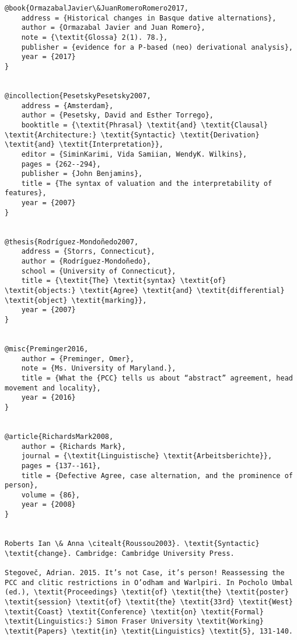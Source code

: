 \documentclass[output=paper,modfonts,nonflat]{langsci/langscibook}
\begin{document}
\begin{verbatim}
@book{OrmazabalJavier\&JuanRomeroRomero2017,
	address = {Historical changes in Basque dative alternations},
	author = {Ormazabal Javier and Juan Romero},
	note = {\textit{Glossa} 2(1). 78.},
	publisher = {evidence for a P-based (neo) derivational analysis},
	year = {2017}
}


@incollection{PesetskyPesetsky2007,
	address = {Amsterdam},
	author = {Pesetsky, David and Esther Torrego},
	booktitle = {\textit{Phrasal} \textit{and} \textit{Clausal} \textit{Architecture:} \textit{Syntactic} \textit{Derivation} \textit{and} \textit{Interpretation}},
	editor = {SiminKarimi, Vida Samiian, WendyK. Wilkins},
	pages = {262--294},
	publisher = {John Benjamins},
	title = {The syntax of valuation and the interpretability of features},
	year = {2007}
}


@thesis{Rodríguez-Mondoñedo2007,
	address = {Storrs, Connecticut},
	author = {Rodríguez-Mondoñedo},
	school = {University of Connecticut},
	title = {\textit{The} \textit{syntax} \textit{of} \textit{objects:} \textit{Agree} \textit{and} \textit{differential} \textit{object} \textit{marking}},
	year = {2007}
}


@misc{Preminger2016,
	author = {Preminger, Omer},
	note = {Ms. University of Maryland.},
	title = {What the {PCC} tells us about “abstract” agreement, head movement and locality},
	year = {2016}
}


@article{RichardsMark2008,
	author = {Richards Mark},
	journal = {\textit{Linguistische} \textit{Arbeitsberichte}},
	pages = {137--161},
	title = {Defective Agree, case alternation, and the prominence of person},
	volume = {86},
	year = {2008}
}


Roberts Ian \& Anna \citealt{Roussou2003}. \textit{Syntactic} \textit{change}. Cambridge: Cambridge University Press.

Stegoveč, Adrian. 2015. It’s not Case, it’s person! Reassessing the PCC and clitic restrictions in O’odham and Warlpiri. In Pocholo Umbal (ed.), \textit{Proceedings} \textit{of} \textit{the} \textit{poster} \textit{session} \textit{of} \textit{the} \textit{33rd} \textit{West} \textit{Coast} \textit{Conference} \textit{on} \textit{Formal} \textit{Linguistics:} Simon Fraser University \textit{Working} \textit{Papers} \textit{in} \textit{Linguistics} \textit{5}, 131-140.

\end{verbatim}
\sloppy\printbibliography[heading=subbibliography,notkeyword=this]
\end{document}
